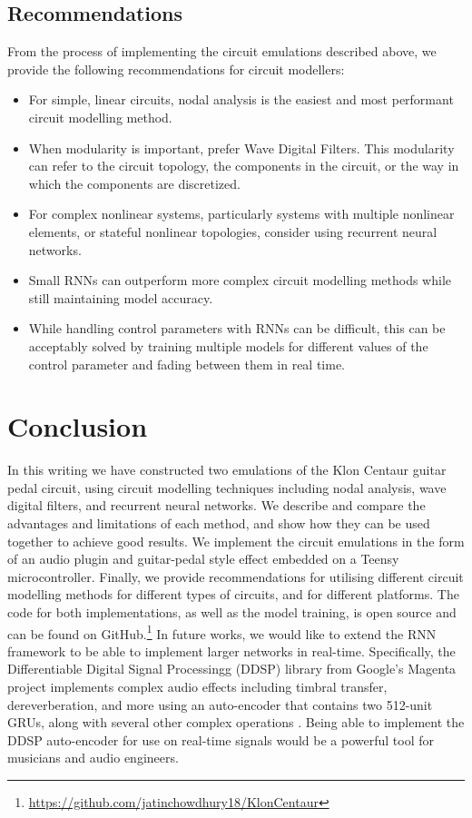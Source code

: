 \documentclass[twoside,a4paper]{article}
\begin{document}
\subsection{Recommendations}
From the process of implementing the circuit emulations described
above, we provide the following recommendations for circuit modellers:
\begin{itemize}
    \item For simple, linear circuits, nodal analysis is the easiest
          and most performant circuit modelling method.
    \item When modularity is important, prefer Wave Digital Filters.
          This modularity can refer to the circuit topology, the
          components in the circuit, or the way in which the components
          are discretized.
    \item For complex nonlinear systems, particularly systems with
          multiple nonlinear elements, or stateful nonlinear topologies,
          consider using recurrent neural networks.
    \item Small RNNs can outperform more complex circuit modelling methods
          while still maintaining model accuracy.
    \item While handling control parameters with RNNs can be difficult,	
          this can be acceptably solved by training multiple models for	
          different values of the control parameter and fading between them	
          in real time.
\end{itemize}

\section{Conclusion}
In this writing we have constructed two emulations of the Klon
Centaur guitar pedal circuit, using circuit modelling techniques
including nodal analysis, wave digital filters, and recurrent
neural networks. We describe and compare the advantages and
limitations of each method, and show how they can be used together
to achieve good results. We implement the circuit emulations in the
form of an audio plugin and guitar-pedal style effect embedded on
a Teensy microcontroller. Finally, we provide recommendations for
utilising different circuit modelling methods for different types
of circuits, and for different platforms. The code for both
implementations, as well as the model training, is open source
and can be found on GitHub.\footnote{\url{https://github.com/jatinchowdhury18/KlonCentaur}}
\newline\newline
In future works, we would like to extend the RNN framework to be able
to implement larger networks in real-time. Specifically, the Differentiable
Digital Signal Processingg (DDSP) library from Google's Magenta project
implements complex audio effects including timbral transfer, dereverberation,
and more using an auto-encoder that contains two 512-unit GRUs, along with
several other complex operations \cite{engel2020ddsp}. Being able to
implement the DDSP auto-encoder for use on real-time signals
would be a powerful tool for musicians and audio engineers.
\end{document}
